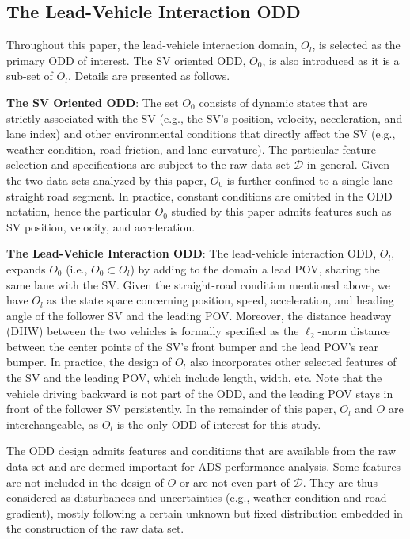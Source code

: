 \documentclass[journal]{IEEEtran}
\begin{document}
\subsection{The Lead-Vehicle Interaction ODD}\label{sec:preliminaries:lead-vehicle}
Throughout this paper, the lead-vehicle interaction domain, $O_l$, is selected as the primary ODD of interest. The SV oriented ODD, $O_0$, is also introduced as it is a sub-set of $O_l$. Details are presented as follows.

\textbf{The SV Oriented ODD}: The set $O_0$ consists of dynamic states that are strictly associated with the SV (e.g., the SV's position, velocity, acceleration, and lane index) and other environmental conditions that directly affect the SV (e.g., weather condition, road friction, and lane curvature). The particular feature selection and specifications are subject to the raw data set $\mathcal{D}$ in general. Given the two data sets analyzed by this paper, $O_0$ is further confined to a single-lane straight road segment. In practice, constant conditions are omitted in the ODD notation, hence the particular $O_0$ studied by this paper admits features such as SV position, velocity, and acceleration.

\textbf{The Lead-Vehicle Interaction ODD}: The lead-vehicle interaction ODD, $O_l$, expands $O_0$ (i.e., $O_0 \subset O_l$) by adding to the domain a lead POV, sharing the same lane with the SV. Given the straight-road condition mentioned above, we have $O_l$ as the state space concerning position, speed, acceleration, and heading angle of the follower SV and the leading POV. Moreover, the distance headway (DHW) between the two vehicles is formally specified as the $\ell_2$-norm distance between the center points of the SV's front bumper and the lead POV's rear bumper. In practice, the design of $O_l$ also incorporates other selected features of the SV and the leading POV, which include length, width, etc. Note that the vehicle driving backward is not part of the ODD, and the leading POV stays in front of the follower SV persistently. In the remainder of this paper, $O_l$ and $O$ are interchangeable, as $O_l$ is the only ODD of interest for this study.

The ODD design admits features and conditions that are available from the raw data set and are deemed important for ADS performance analysis. Some features are not included in the design of $O$ or are not even part of $\mathcal{D}$. They are thus considered as disturbances and uncertainties (e.g., weather condition and road gradient), mostly following a certain unknown but fixed distribution embedded in the construction of the raw data set. 
\end{document}
